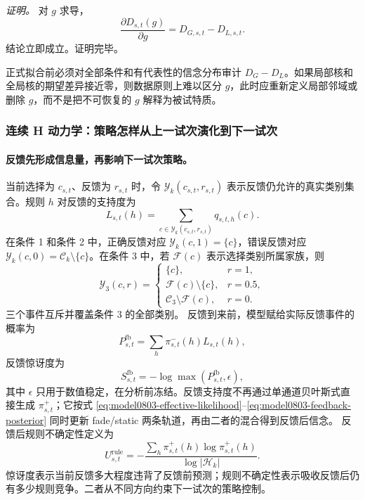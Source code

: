 \textit{证明。}
对 $g$ 求导，
\begin{equation}
    \frac{\partial D_{s,t}(g)}{\partial g}
    =D_{G,s,t}-D_{L,s,t}.
\end{equation}
结论立即成立。证明完毕。

正式拟合前必须对全部条件和有代表性的信念分布审计 $D_G-D_L$。如果局部核和全局核的期望差异接近零，则数据原则上难以区分 $g$，此时应重新定义局部邻域或删除 $g$，而不是把不可恢复的 $g$ 解释为被试特质。


\subsubsection{连续 H 动力学：策略怎样从上一试次演化到下一试次}

\paragraph{反馈先形成信息量，再影响下一试次策略。}
当前选择为 $c_{s,t}$、反馈为 $r_{s,t}$ 时，令 $\mathcal Y_k(c_{s,t},r_{s,t})$ 表示反馈仍允许的真实类别集合。规则 $h$ 对反馈的支持度为
\begin{equation}
    L_{s,t}(h)
    =\sum_{c\in\mathcal Y_k(c_{s,t},r_{s,t})}
      q_{s,t,h}(c).
    \label{eq:model0803-feedback-likelihood}
\end{equation}
在条件 1 和条件 2 中，正确反馈对应 $\mathcal Y_k(c,1)=\{c\}$，错误反馈对应 $\mathcal Y_k(c,0)=\mathcal C_k\setminus\{c\}$。在条件 3 中，若 $\mathcal F(c)$ 表示选择类别所属家族，则
\begin{equation}
    \mathcal Y_3(c,r)
    =
    \begin{cases}
      \{c\},&r=1,\\
      \mathcal F(c)\setminus\{c\},&r=0.5,\\
      \mathcal C_3\setminus\mathcal F(c),&r=0.
    \end{cases}
    \label{eq:model0803-graded-feedback}
\end{equation}
三个事件互斥并覆盖条件 3 的全部类别。
反馈到来前，模型赋给实际反馈事件的概率为
\begin{equation}
    P_{s,t}^{\mathrm{fb}}
    =\sum_h\pi^-_{s,t}(h)L_{s,t}(h),
\end{equation}
反馈惊讶度为
\begin{equation}
    S_{s,t}^{\mathrm{fb}}
    =-\log\max(P_{s,t}^{\mathrm{fb}},\epsilon),
    \label{eq:model0803-feedback-surprise}
\end{equation}
其中 $\epsilon$ 只用于数值稳定，在分析前冻结。反馈支持度不再通过单通道贝叶斯式直接生成 $\pi^+_{s,t}$；它按式 \ref{eq:model0803-effective-likelihood}--\ref{eq:model0803-feedback-posterior} 同时更新 fade/static 两条轨道，再由二者的混合得到反馈后信念。
反馈后规则不确定性定义为
\begin{equation}
    U^{\mathrm{rule}}_{s,t}
    =-
    \frac{\sum_h\pi^+_{s,t}(h)
      \log\pi^+_{s,t}(h)}
    {\log|\mathcal H_k|}.
    \label{eq:model0803-rule-uncertainty}
\end{equation}
惊讶度表示当前反馈多大程度违背了反馈前预测；规则不确定性表示吸收反馈后仍有多少规则竞争。二者从不同方向约束下一试次的策略控制。

